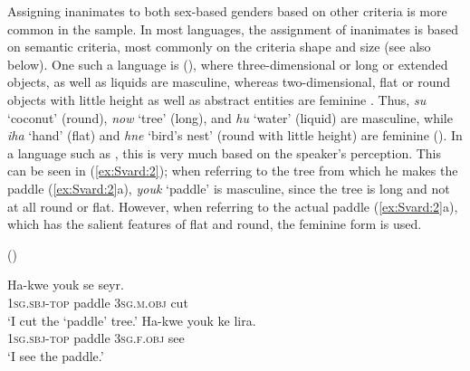\documentclass[output=collectionpaper]{langsci/langscibook}
\begin{document}
\newpage 
Assigning inanimates to both sex-based genders based on other criteria is more common in the sample. In most languages, the assignment of inanimates is based on semantic criteria, most commonly on the criteria shape and size (see also  below). One such a language is  (), where three-dimensional or long or extended objects, as well as liquids are masculine, whereas two-dimensional, flat or round objects with little height as well as abstract entities are feminine \citep[47]{Lock2011}. Thus, \textit{su} `coconut' (round), \textit{now} `tree' (long), and \textit{hu} `water' (liquid) are masculine, while \textit{iha} `hand' (flat) and \textit{hne} `bird's nest' (round with little height) are feminine (\citealt[48--50]{Lock2011}). In a language such as , this is very much based on the speaker's perception. This can be seen in (\ref{ex:Svard:2}); when referring to the tree from which he makes the paddle (\ref{ex:Svard:2}a), \textit{youk} `paddle' is masculine, since the tree is long and not at all round or flat. However, when referring to the actual paddle (\ref{ex:Svard:2}a), which has the salient features of flat and round, the feminine form is used.


\ea
\label{ex:Svard:2}
 () \citep[50]{Lock2011}\\
\begin{xlist}
\ex
\gll Ha-kwe youk se seyr.\\
     \textsc{1sg.sbj-top} paddle \textsc{3sg.m.obj} cut\\
\glt `I cut the `paddle' tree.'
\ex
\gll Ha-kwe youk ke lira.\\
     \textsc{1sg.sbj-top} paddle \textsc{3sg.f.obj} see\\
\glt `I see the paddle.'
\end{xlist}
\z
\end{document}
